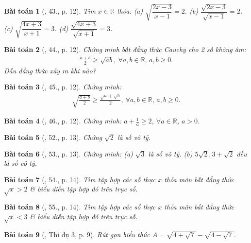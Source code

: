 \documentclass{article}
\newtheorem{baitoan}{Bài toán}
\begin{document}
\begin{baitoan}[\cite{SBT_Toan_9_tap_1}, 43., p. 12]
	Tìm $x\in\mathbb{R}$ thỏa: (a) $\sqrt{\dfrac{2x - 3}{x - 1}} = 2$. (b) $\dfrac{\sqrt{2x - 3}}{\sqrt{x - 1}} = 2$. (c) $\sqrt{\dfrac{4x + 3}{x + 1}} = 3$. (d) $\dfrac{\sqrt{4x + 3}}{\sqrt{x + 1}} = 3$.
\end{baitoan}

\begin{baitoan}[\cite{SBT_Toan_9_tap_1}, 44., p. 12]
	Chứng minh bất đẳng thức Cauchy cho 2 số không âm:
	\begin{align*}
		\frac{a + b}{2}\ge\sqrt{ab},\ \forall a,b\in\mathbb{R},\,a,b\ge0.
	\end{align*}
	Dấu đẳng thức xảy ra khi nào?
\end{baitoan}

\begin{baitoan}[\cite{SBT_Toan_9_tap_1}, 45., p. 12]
	Chứng minh:
	\begin{align*}
		\sqrt{\frac{a + b}{2}}\ge\frac{\sqrt{a} + \sqrt{b}}{2},\ \forall a,b\in\mathbb{R},\,a,b\ge0.
	\end{align*}
\end{baitoan}

\begin{baitoan}[\cite{SBT_Toan_9_tap_1}, 46., p. 12]
	Chứng minh: $a + \frac{1}{a}\ge2$, $\forall a\in\mathbb{R}$, $a > 0$.
\end{baitoan}

\begin{baitoan}[\cite{SBT_Toan_9_tap_1}, 52., p. 13]
	Chứng $\sqrt{2}$ là số vô tỷ.
\end{baitoan}

\begin{baitoan}[\cite{SBT_Toan_9_tap_1}, 53., p. 13]
	Chứng minh: (a) $\sqrt{3}$ là số vô tỷ. (b) $5\sqrt{2},3 + \sqrt{2}$ đều là số vô tỷ.
\end{baitoan}

\begin{baitoan}[\cite{SBT_Toan_9_tap_1}, 54., p. 14]
	Tìm tập hợp các số thực $x$ thỏa mãn bất đẳng thức $\sqrt{x} > 2$ \& biểu diễn tập hợp đó trên trục số.
\end{baitoan}

\begin{baitoan}[\cite{SBT_Toan_9_tap_1}, 55., p. 14]
	Tìm tập hợp các số thực $x$ thỏa mãn bất đẳng thức $\sqrt{x} < 3$ \& biểu diễn tập hợp đó trên trục số.
\end{baitoan}

\begin{baitoan}[\cite{Tuyen_Toan_9}, Thí dụ 3, p. 9]
	Rút gọn biểu thức $A = \sqrt{4 + \sqrt{7}} - \sqrt{4 - \sqrt{7}}$.
\end{baitoan}
\end{document}
